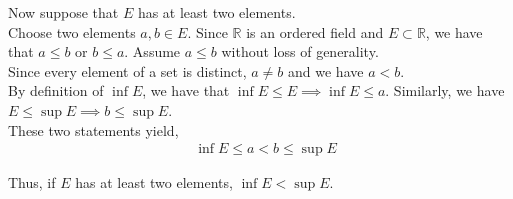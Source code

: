 \documentclass[12pt]{article}
\begin{document}
Now suppose that $E$ has at least two elements.\\

Choose two elements $a, b \in E$. Since $\mathbb{R}$ is an ordered field and $E \subset \mathbb{R}$, we have that $a \leq b$ or $b \leq a$. Assume $a \leq b$ without loss of generality.\\

Since every element of a set is distinct, $a \neq b$ and we have $a < b$.\\

By definition of $\inf E$, we have that $\inf E \leq E \implies \inf E \leq a$. Similarly, we have $E \leq \sup E \implies b \leq \sup E$.\\

These two statements yield,
\begin{align*}
&\inf E \leq a < b \leq \sup E
\end{align*}

Thus, if $E$ has at least two elements, $\inf E < \sup E$.
\end{document}
